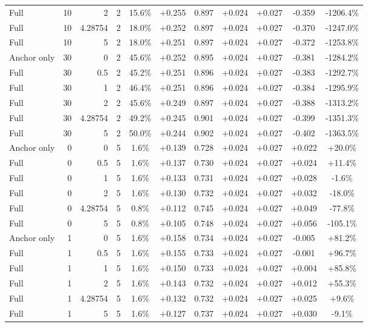 \begin{table}[htbp]
\begin{tabular}{lrrrccccccc}
Full & 10 & 2 & 2 & 15.6\% & +0.255 & 0.897 & +0.024 & +0.027 & -0.359 & -1206.4\% \\
Full & 10 & 4.28754 & 2 & 18.0\% & +0.252 & 0.897 & +0.024 & +0.027 & -0.370 & -1247.0\% \\
Full & 10 & 5 & 2 & 18.0\% & +0.251 & 0.897 & +0.024 & +0.027 & -0.372 & -1253.8\% \\
Anchor only & 30 & 0 & 2 & 45.6\% & +0.252 & 0.895 & +0.024 & +0.027 & -0.381 & -1284.2\% \\
Full & 30 & 0.5 & 2 & 45.2\% & +0.251 & 0.896 & +0.024 & +0.027 & -0.383 & -1292.7\% \\
Full & 30 & 1 & 2 & 46.4\% & +0.251 & 0.896 & +0.024 & +0.027 & -0.384 & -1295.9\% \\
Full & 30 & 2 & 2 & 45.6\% & +0.249 & 0.897 & +0.024 & +0.027 & -0.388 & -1313.2\% \\
Full & 30 & 4.28754 & 2 & 49.2\% & +0.245 & 0.901 & +0.024 & +0.027 & -0.399 & -1351.3\% \\
Full & 30 & 5 & 2 & 50.0\% & +0.244 & 0.902 & +0.024 & +0.027 & -0.402 & -1363.5\% \\
Anchor only & 0 & 0 & 5 & 1.6\% & +0.139 & 0.728 & +0.024 & +0.027 & +0.022 & +20.0\% \\
Full & 0 & 0.5 & 5 & 1.6\% & +0.137 & 0.730 & +0.024 & +0.027 & +0.024 & +11.4\% \\
Full & 0 & 1 & 5 & 1.6\% & +0.133 & 0.731 & +0.024 & +0.027 & +0.028 & -1.6\% \\
Full & 0 & 2 & 5 & 1.6\% & +0.130 & 0.732 & +0.024 & +0.027 & +0.032 & -18.0\% \\
Full & 0 & 4.28754 & 5 & 0.8\% & +0.112 & 0.745 & +0.024 & +0.027 & +0.049 & -77.8\% \\
Full & 0 & 5 & 5 & 0.8\% & +0.105 & 0.748 & +0.024 & +0.027 & +0.056 & -105.1\% \\
Anchor only & 1 & 0 & 5 & 1.6\% & +0.158 & 0.734 & +0.024 & +0.027 & -0.005 & +81.2\% \\
Full & 1 & 0.5 & 5 & 1.6\% & +0.155 & 0.733 & +0.024 & +0.027 & -0.001 & +96.7\% \\
Full & 1 & 1 & 5 & 1.6\% & +0.150 & 0.733 & +0.024 & +0.027 & +0.004 & +85.8\% \\
Full & 1 & 2 & 5 & 1.6\% & +0.143 & 0.732 & +0.024 & +0.027 & +0.012 & +55.3\% \\
Full & 1 & 4.28754 & 5 & 1.6\% & +0.132 & 0.732 & +0.024 & +0.027 & +0.025 & +9.6\% \\
Full & 1 & 5 & 5 & 1.6\% & +0.127 & 0.737 & +0.024 & +0.027 & +0.030 & -9.1\% \\

\end{tabular}
\end{table}
